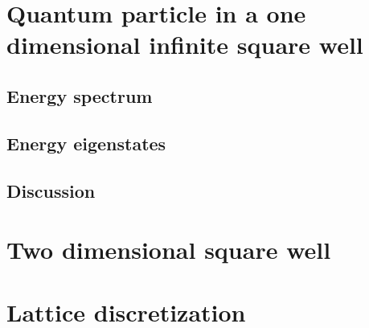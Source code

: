 \section{Quantum particle in a one dimensional infinite square well}

  \subsection{Energy spectrum}

  \subsection{Energy eigenstates}

  \subsection{Discussion}

\section{Two dimensional square well}

\section{Lattice discretization}



